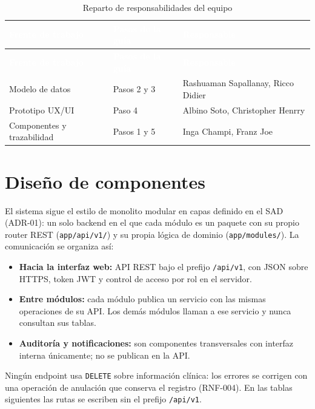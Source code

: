 \documentclass[11pt,a4paper]{article}
\newcommand{\cab}[1]{\textcolor{white}{\textbf{#1}}}
\begin{document}
\begin{xltabular}{\linewidth}{|P{4.5cm}|P{3.5cm}|L|}
  \caption{Reparto de responsabilidades del equipo}\label{tab:reparto}\\
  \hline
  \cab{Frente de trabajo} & \cab{Pasos de la guía} & \cab{Responsable} \\ \hline
  \endfirsthead
  \hline
  \cab{Frente de trabajo} & \cab{Pasos de la guía} & \cab{Responsable} \\ \hline
  \endhead
  Modelo de datos            & Pasos 2 y 3 & Rashuaman Sapallanay, Ricco Didier \\ \hline
  Prototipo UX/UI            & Paso 4      & Albino Soto, Christopher Henrry \\ \hline
  Componentes y trazabilidad & Pasos 1 y 5 & Inga Champi, Franz Joe \\ \hline
\end{xltabular}

\newpage
\section{Diseño de componentes}\label{sec:componentes}

El sistema sigue el estilo de monolito modular en capas definido en el SAD (ADR-01): un solo
backend en el que cada módulo es un paquete con su propio router REST (\nolinkurl{app/api/v1/})
y su propia lógica de dominio (\nolinkurl{app/modules/}). La comunicación se organiza así:

\begin{itemize}[nosep]
  \item \textbf{Hacia la interfaz web:} API REST bajo el prefijo \texttt{/api/v1}, con JSON sobre
        HTTPS, token JWT y control de acceso por rol en el servidor.
  \item \textbf{Entre módulos:} cada módulo publica un servicio con las mismas operaciones de su
        API. Los demás módulos llaman a ese servicio y nunca consultan sus tablas.
  \item \textbf{Auditoría y notificaciones:} son componentes transversales con interfaz interna
        únicamente; no se publican en la API.
\end{itemize}

Ningún endpoint usa \texttt{DELETE} sobre información clínica: los errores se corrigen con una
operación de anulación que conserva el registro (RNF-004). En las tablas siguientes las rutas
se escriben sin el prefijo \texttt{/api/v1}.
\end{document}
